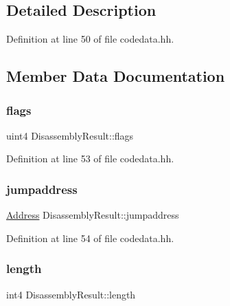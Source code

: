 \subsection{Detailed Description}


Definition at line 50 of file codedata.\+hh.



\subsection{Member Data Documentation}
\mbox{\label{struct_disassembly_result_af848ddf0a7556f24164e2d8063ad4341}} 
\subsubsection{\texorpdfstring{flags}{flags}}
{\footnotesize\ttfamily uint4 Disassembly\+Result\+::flags}



Definition at line 53 of file codedata.\+hh.

\mbox{\label{struct_disassembly_result_aebea0a6685b8fd448cf906f661758932}} 
\subsubsection{\texorpdfstring{jumpaddress}{jumpaddress}}
{\footnotesize\ttfamily \mbox{\hyperlink{class_address}{Address}} Disassembly\+Result\+::jumpaddress}



Definition at line 54 of file codedata.\+hh.

\mbox{\label{struct_disassembly_result_a40f1a3bd43478be9ae3029c15a656495}} 
\subsubsection{\texorpdfstring{length}{length}}
{\footnotesize\ttfamily int4 Disassembly\+Result\+::length}



